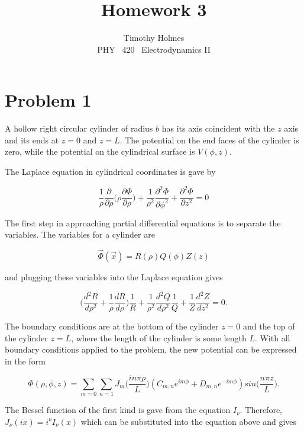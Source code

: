 \documentclass[11pt]{article}
\newcommand{\HWnum}{3}
\newcommand{\CourseNum}{420}           %
\newcommand{\Subject}{PHY}
\begin{document}

\title{Homework {\HWnum}}
\author{Timothy Holmes \\ \Subject ~ \CourseNum ~ Electrodynamics II}

\maketitle

\section*{Problem 1}

A hollow right circular cylinder of radius $b$ has its axis coincident with the $z$ axis and its ends at $z = 0$ and $z = L$. The potential on the end faces of the cylinder is zero, while the potential on the cylindrical surface is $V(\phi, z)$.

The Laplace equation in cylindrical coordinates is gave by

$$
\frac{1}{\rho} \frac{\partial}{\partial \rho} \Bigg( \rho \frac{\partial \Phi}{\partial \rho}\Bigg) + \frac{1}{\rho^{2}} \frac{\partial^{2} \Phi}{\partial \phi^{2}} + \frac{\partial^{2} \Phi}{\partial z^{2}}= 0
$$

The first step in approaching partial differential equations is to separate the variables. The variables for a cylinder are

$$
\vec{\Phi} (\vec{x}) = R(\rho)Q(\phi)Z(z)
$$

and plugging these variables into the Laplace equation gives

$$
\Bigg( \frac{d^{2}R}{d\rho^{2}} + \frac{1}{\rho}\frac{dR}{d\rho} \Bigg) \frac{1}{R} + \frac{1}{\rho^{2}} \frac{d^{2}Q}{d\rho^{2}} \frac{1}{Q} + \frac{1}{Z}\frac{d^{2}Z}{dz^{2}} = 0.
$$

The boundary conditions are at the bottom of the cylinder $z = 0$ and the top of the cylinder $z = L$, where the length of the cylinder is some length $L$. With all boundary conditions applied to the problem, the new potential can be expressed in the form 

$$
\Phi(\rho, \phi, z) = \sum_{m = 0} \sum_{n = 1} J_{m}\Big(\frac{in\pi \rho}{L}\Big) (C_{m, n} e^{im\phi} + D_{m, n} e^{-im\phi})sin\Big(\frac{n\pi z}{L} \Big).
$$

The Bessel function of the first kind is gave from the equation $I_{\nu}$. Therefore, $J_{\nu}(ix) = i^{\nu} I_{\nu}(x)$ which can be substituted into the equation above and gives
\end{document}
